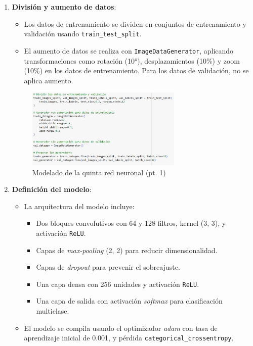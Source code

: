 \begin{enumerate}
	\item \textbf{División y aumento de datos}:
	\begin{itemize}
		\item Los datos de entrenamiento se dividen en conjuntos de entrenamiento y validación usando \texttt{train\_test\_split}.
		\item El aumento de datos se realiza con \texttt{ImageDataGenerator}, aplicando transformaciones como rotación (10°), desplazamientos (10\%) y zoom (10\%) en los datos de entrenamiento. Para los datos de validación, no se aplica aumento.
	\end{itemize}
	
	\begin{figure}[H]
		\centering
		\includegraphics[width=0.7\textwidth]{imgs/model-1-red5.JPG}
		\caption{Modelado de la quinta red neuronal (pt. 1)}
		\label{fig:model-1-red5}
	\end{figure}
	
	\item \textbf{Definición del modelo}:
	\begin{itemize}
		\item La arquitectura del modelo incluye:
		\begin{itemize}
			\item Dos bloques convolutivos con 64 y 128 filtros, kernel (3, 3), y activación \texttt{ReLU}.
			\item Capas de \textit{max-pooling} (2, 2) para reducir dimensionalidad.
			\item Capas de \textit{dropout} para prevenir el sobreajuste.
			\item Una capa densa con 256 unidades y activación \texttt{ReLU}.
			\item Una capa de salida con activación \textit{softmax} para clasificación multiclase.
		\end{itemize}
		\item El modelo se compila usando el optimizador \textit{adam} con tasa de aprendizaje inicial de 0.001, y pérdida \texttt{categorical\_crossentropy}.
	\end{itemize}
	

\end{enumerate}
